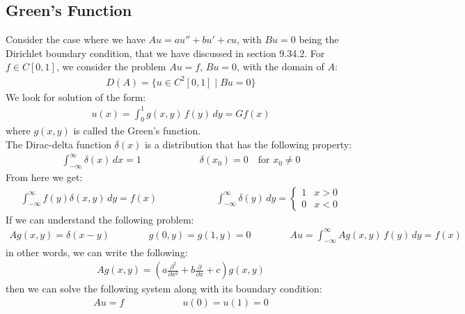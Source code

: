 \documentclass[11pt]{book}
\theoremstyle{break}
\theoremstyle{break}
\newcommand{\pd}{\partial}
\begin{document}
\subsection{Green's Function}
Consider the case where we have $Au = au'' + bu' + cu$, with $Bu = 0$ being the Dirichlet boundary condition, that we have discussed in section 9.34.2. For $f \in C[0,1]$, we consider the problem $Au = f$, $Bu = 0$, with the domain of $A$:
\begin{align*}
D(A) = \{ u \in C^2[0,1] \mid Bu = 0\}
\end{align*}
We look for solution of the form:
\begin{align*}
u(x) = \int_0^1 g(x,y) \, f(y) \, dy = Gf(x)
\end{align*}
where $g(x,y)$ is called the Green's function. \\
The Dirac-delta function $\delta(x)$ is a distribution that has the following property:
\begin{align*}
\int_{-\infty}^\infty \delta(x)\, dx = 1 \qquad\qquad\qquad \delta(x_0) = 0 \quad \text{for }x_0 \neq 0
\end{align*}
From here we get:
\begin{align*}
\int_{-\infty}^{\infty}f(y)\delta(x,y) \, dy = f(x) \qquad\qquad\qquad \int_{-\infty}^{\infty}\delta(y) \, dy = \begin{cases} 1 & x>0 \\ 0 & x<0 \end{cases}
\end{align*}
If we can understand the following problem:
\begin{align*}
Ag(x,y) = \delta(x-y) \qquad\qquad g(0,y) = g(1,y) = 0 \qquad\qquad Au = \int_{-\infty}^{\infty}Ag(x,y) \, f(y) \, dy = f(x)
\end{align*}
in other words, we can write the following:
\begin{align*}
Ag(x,y) = \left( a\frac{\pd^2}{\pd x^2} + b \frac{\pd}{\pd x}+ c\right) g(x,y)
\end{align*}
then we can solve the following system along with its boundary condition:
\begin{align}
Au = f \qquad\qquad \qquad u(0)= u(1) = 0
\end{align}
\end{document}
